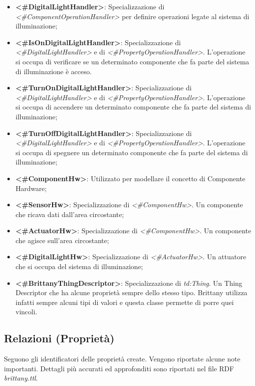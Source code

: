 \begin{itemize}
	\item \textbf{<\#DigitalLightHandler>}: Specializzazione di \textit{<\#ComponentOperationHandler>} per definire operazioni legate al sistema di illuminazione;

	\item \textbf{<\#IsOnDigitalLightHandler>}: Specializzazione di \textit{<\#DigitalLightHandler>} e di \textit{<\#PropertyOperationHandler>}. L'operazione si occupa di verificare se un determinato componente che fa parte del sistema di illuminazione è acceso.

	\item \textbf{<\#TurnOnDigitalLightHandler>}: Specializzazione di \textit{<\#DigitalLightHandler>} e di \textit{<\#PropertyOperationHandler>}. L'operazione si occupa di accendere un determinato componente che fa parte del sistema di illuminazione;

	\item \textbf{<\#TurnOffDigitalLightHandler>}: Specializzazione di \textit{<\#DigitalLightHandler>} e di \textit{<\#PropertyOperationHandler>}. L'operazione si occupa di spegnere un determinato componente che fa parte del sistema di illuminazione;

	\item \textbf{<\#ComponentHw>}: Utilizzato per modellare il concetto di Componente Hardware;

	\item \textbf{<\#SensorHw>}: Specializzazione di \textit{<\#ComponentHw>}. Un componente che ricava dati dall'area circostante;

	\item \textbf{<\#ActuatorHw>}: Specializzazione di \textit{<\#ComponentHw>}. Un componente che agisce sull'area circostante;

	\item \textbf{<\#DigitalLightHw>}: Specializzazione di \textit{<\#ActuatorHw>}. Un attuatore che si occupa del sistema di illuminazione;

	\item \textbf{<\#BrittanyThingDescriptor>}: Specializzazione di \textit{td:Thing}. Un Thing Descriptor che ha alcune proprietà sempre dello stesso tipo. Brittany utilizza infatti sempre alcuni tipi di valori e questa classe permette di porre quei vincoli.
\end{itemize}

\subsection{Relazioni (Proprietà)}
Seguono gli identificatori delle proprietà create. Vengono riportate alcune note importanti. Dettagli più accurati ed approfonditi sono riportati nel file RDF \textit{brittany.ttl}.

